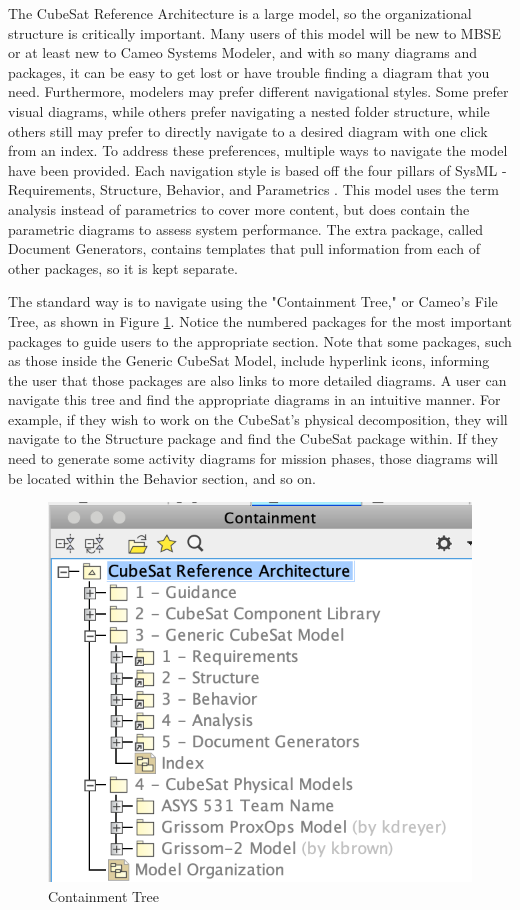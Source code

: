 
The CubeSat Reference Architecture is a large model, so the organizational structure is critically important. Many users of this model will be new to MBSE or at least new to Cameo Systems Modeler, and with so many diagrams and packages, it can be easy to get lost or have trouble finding a diagram that you need. Furthermore, modelers may prefer different navigational styles. Some prefer visual diagrams, while others prefer navigating a nested folder structure, while others still may prefer to directly navigate to a desired diagram with one click from an index. To address these preferences, multiple ways to navigate the model have been provided. Each navigation style is based off the four pillars of SysML - Requirements, Structure, Behavior, and Parametrics \citep{SysML}. This model uses the term analysis instead of parametrics to cover more content, but does contain the parametric diagrams to assess system performance. The extra package, called Document Generators, contains templates that pull information from each of other packages, so it is kept separate. 

The standard way is to navigate using the "Containment Tree," or Cameo's File Tree, as shown in Figure \ref{fig:Containment Tree}. Notice the numbered packages for the most important packages to guide users to the appropriate section. Note that some packages, such as those inside the Generic CubeSat Model, include hyperlink icons, informing the user that those packages are also links to more detailed diagrams. A user can navigate this tree and find the appropriate diagrams in an intuitive manner. For example, if they wish to work on the CubeSat's physical decomposition, they will navigate to the Structure package and find the CubeSat package within. If they need to generate some activity diagrams for mission phases, those diagrams will be located within the Behavior section, and so on. 

\begin{figure}[H]
    \centering
    \includegraphics[width=4 in]{Thesis/Analysis_and_Results/Analysis and Results Figures/Containment Tree.png}
    \caption{Containment Tree}
    \label{fig:Containment Tree}
\end{figure}

